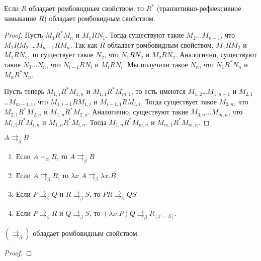 \begin{lemma}
    Если $R$ обладает ромбовидным свойством, то $R^{*}$ (транзитивно-рефлексивное замыкание $R$) обладает ромбовидным свойством.
\end{lemma}

\begin{proof}
    Пусть $M_1 R^{*} M_n$ и $M_1 R N_1$. Тогда существуют такие $M_2 \ldots M_{n-1}$, что $M_1 R M_2$ \ldots $M_{n-1} R M_n$.
    Так как $R$ обладает ромбовидным свойством, $M_1 R M_2$ и $M_1 R N_1$, то существует такое $N_2$,
    что $N_1 R N_2$ и $M_2 R N_2$. Аналогично, существуют такие $N_3 \ldots N_n$, что $N_{i-1} R N_{i}$ и $M_i R N_i$.
    Мы получили такое $N_n$, что $N_1 R^{*} N_n$ и $M_n R^{*} N_n$.

    Пусть теперь $M_{1,1}R^{*}M_{1,n}$ и $M_{1,1}R^{*}M_{m,1}$, то есть имеются $M_{1,2}$\ldots$M_{1,n-1}$ и $M_{2,1}$\ldots$M_{m-1,1}$,
    что $M_{1,i-1} R M_{1,i}$ и $M_{i-1, 1} R M_{i, 1}$.
    Тогда существует такое $M_{2,n}$, что $M_{2,1} R^{*} M_{2,n}$ и $M_{1,n} R^{*} M_{2,n}$.
    Аналогично, существуют такие $M_{3,n}\ldots M_{m,n}$, что $M_{i,1} R^{*} M_{i,n}$ и $M_{1,n} R^{*} M_{i,n}$.
    Тогда $M_{1,n} R^{*} M_{m,n}$ и $M_{m,1} R^{*} M_{m,n}$.
\end{proof}

\begin{definition}
    $A \rightrightarrows_{\beta} B$
    \begin{enumerate}
        \item Если $A =_\alpha B$, то $A \rightrightarrows_{\beta}B$
        \item Если $A \rightrightarrows_{\beta} B$, то $\lambda x.A \rightrightarrows_{\beta} \lambda x . B$
        \item Если $P \rightrightarrows_{\beta} Q$ и $R \rightrightarrows_{\beta} S$, то $PR \rightrightarrows_{\beta} QS$
        \item Если $P \rightrightarrows_{\beta}R$ и $Q \rightrightarrows_{\beta} S$,
            то $(\lambda x . P) Q \rightrightarrows_{\beta} R_{[x\coloneqq{}S]}$.
    \end{enumerate}
\end{definition}

\begin{statement} \label{st-star}
    $(\rightrightarrows_{\beta})$ обладает ромбовидным свойством.
\end{statement}

\begin{proof}
    \todo %
\end{proof}

